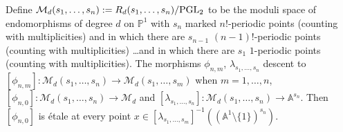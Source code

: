 \documentclass[12pt]{amsart}
\theoremstyle{plain}
\theoremstyle{remark}
\theoremstyle{definition}
\def\A{\mathbb A}
\def\P{\mathbb P}
\def\sM{\mathcal M}
\def\PGL{{\rm PGL}}
\def\Per{{\rm Per}}
\def\la{\lambda}
\begin{document}
%
%
%

Define $\sM_d(s_1,\dots,s_n):=R_d(s_1,\dots, s_n)/\PGL_2$ to be the moduli space of endomorphisms of degree $d$ on $\P^1$ 
with $s_n$ marked $n!$-periodic points (counting with multiplicities) and in which there are $s_{n-1}$ $(n-1)!$-periodic points (counting with multiplicities) \dots and in which there are $s_{1}$ $1$-periodic points (counting with multiplicities).
The morphisms $\phi_{n,m}$, $\la_{s_1,\dots, s_n}$ descent to 
$[\phi_{n,m}]:\sM_d(s_1,\dots,s_n)\to \sM_d(s_1,\dots,s_m)$ when $m=1,\dots, n$, $[\phi_{n,0}]:\sM_d(s_1,\dots,s_n)\to \sM_d$ and $[\la_{s_1,\dots, s_n}]: \sM_d(s_1,\dots, s_n)\to \A^{s_n}.$
Then
$[\phi_{n,0}]$ is \'etale at every point $x\in [\la_{s_1,\dots,s_m}]^{-1}((\A^1\setminus \{1\})^{s_n}).$ 
\end{document}
